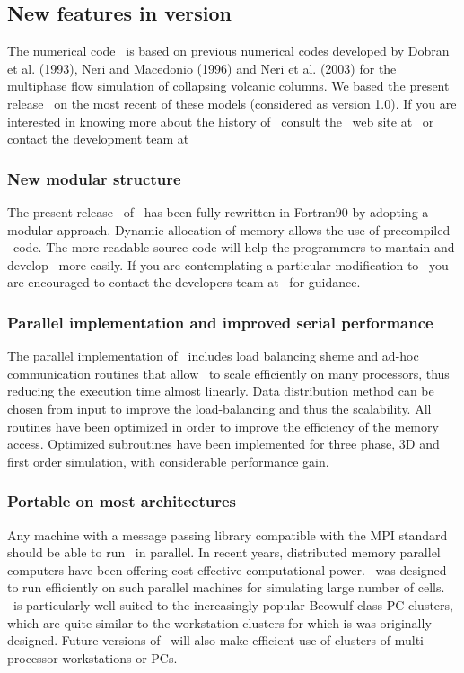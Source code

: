 \subsection{New features in version \PDACVERSION}

The numerical code \PDAC\ is based on previous numerical codes developed
by Dobran et al. (1993), Neri and Macedonio (1996) and Neri et al. (2003)
for the multiphase flow simulation of collapsing volcanic columns. We based
the present release \PDACVERSION\ on the most recent of these models 
(considered as version 1.0). If you are interested in knowing more about
the history of \PDAC\, consult the \PDAC\ web site at 
\PDACURL\ or contact the development team at 
\PDACADDRESS\

\subsubsection*{New modular structure}
The present release \PDACVERSION\ of \PDAC\ has been fully rewritten in 
Fortran90 by adopting a modular approach. Dynamic allocation of memory
allows the use of precompiled \PDAC\ code. The more readable source code
will help the programmers to mantain and develop \PDAC\ more easily.
If you are contemplating a particular modification to \PDAC\
you are encouraged to contact the developers team at \PDACADDRESS\
for guidance.

\subsubsection*{Parallel implementation and improved serial performance}
The parallel implementation of \PDAC\ includes load balancing sheme 
and ad-hoc communication routines that allow \PDAC\ to scale efficiently 
on many processors, thus reducing the execution time almost linearly.
Data distribution method can be chosen from input to improve the 
load-balancing and thus the scalability. All routines have been 
optimized in order to improve the efficiency of the memory access.
Optimized subroutines have been implemented for three phase, 3D and
first order simulation, with considerable performance gain.

\subsubsection*{Portable on most architectures}
Any machine with a message passing library compatible with the MPI 
standard should be able to run \PDAC\ in parallel.
In recent years, distributed memory parallel computers have been offering
cost-effective computational power.  \PDAC\ was designed to run efficiently
on such parallel machines for simulating large number of cells. 
\PDAC\ is particularly well suited to the increasingly popular Beowulf-class PC 
clusters, which are quite similar to the workstation clusters for which is was 
originally designed.
Future versions of \PDAC\ will also make efficient use of clusters of 
multi-processor workstations or PCs.

